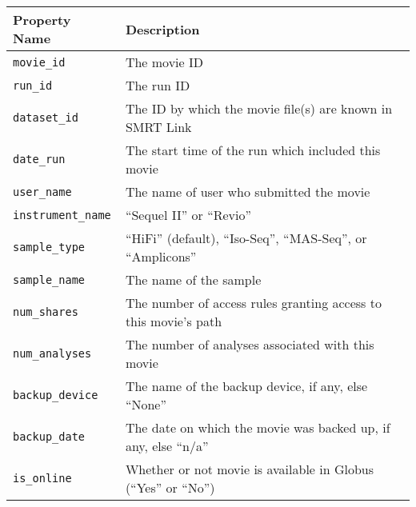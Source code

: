 \begin{tabularx}{\textwidth}{l|X}
\hline
 Property Name   & Description                                                     \\
\hline
 \texttt{movie\_id}        & The movie ID                                                    \\
 \texttt{run\_id}          & The run ID                                                      \\
 \texttt{dataset\_id}      & The ID by which the movie file(s) are known in SMRT Link        \\
 \texttt{date\_run}        & The start time of the run which included this movie             \\
 \texttt{user\_name}       & The name of user who submitted the movie                        \\
 \texttt{instrument\_name} & ``Sequel II'' or ``Revio''                                      \\
 \texttt{sample\_type}     & ``HiFi'' (default), ``Iso-Seq'', ``MAS-Seq'', or ``Amplicons''  \\
 \texttt{sample\_name}     & The name of the sample                                          \\
 \texttt{num\_shares}      & The number of access rules granting access to this movie's path \\
 \texttt{num\_analyses}    & The number of analyses associated with this movie               \\
 \texttt{backup\_device}   & The name of the backup device, if any, else ``None''            \\
 \texttt{backup\_date}     & The date on which the movie was backed up, if any, else ``n/a'' \\
 \texttt{is\_online}       & Whether or not movie is available in Globus (``Yes'' or ``No'') \\
\hline
\end{tabularx}